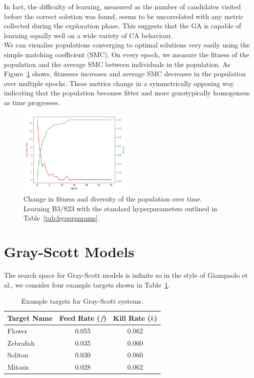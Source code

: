 In fact, the difficulty of learning, measured as the number of candidates visited before the correct solution was found, seems to be uncorrelated with any metric collected during the exploration phase. This suggests that the GA is capable of learning equally well on a wide variety of CA behaviour.\\

We can visualise populations converging to optimal solutions very easily using the simple matching coefficient (SMC). On every epoch, we measure the fitness of the population and the average SMC between individuals in the population. As Figure~\ref{fig:smd} shows, fitnesses increases and average SMC decreases in the population over multiple epochs. These metrics change in a symmetrically opposing way indicating that the population becomes fitter and more genotypically homogenous as time progresses.

\begin{figure}[!h]
\centering
\includegraphics[width=0.5\textwidth]{images/smd.png}
\caption{Change in fitness and diversity of the population over time. Learning B3/S23 with the standard hyperparameters outlined in Table~\ref{tab:hyperparams}.}
\label{fig:smd}
\end{figure}

\section{Gray-Scott Models}

The search space for Gray-Scott models is infinite so in the style of Giampaolo et al.\cite{giampaolo2022physics}, we consider four example targets shown in Table~\ref{table:gs-targets}.\\

\begin{table}[H]
    \centering
    \begin{tabular}{ |l|c|c| } 
        \hline
        Target Name & Feed Rate ($f$) & Kill Rate ($k$)\\
        \hline
        Flower & 0.055 & 0.062\\
        Zebrafish & 0.035 & 0.060\\
        Soliton & 0.030 & 0.060\\
        Mitosis & 0.028 & 0.062\\
        \hline
    \end{tabular}
    \caption{Example targets for Gray-Scott systems.}
    \label{table:gs-targets}
\end{table}


